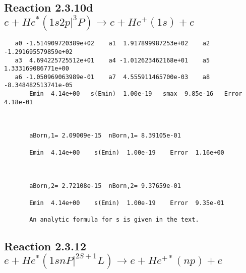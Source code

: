\documentclass[12pt]{article}
\begin{document}
\newpage
\subsection{
Reaction 2.3.10d $e + He^*(1s2p|^3P) \rightarrow e + He^+(1s) + e$}














\begin{small}\begin{verbatim}
   a0 -1.514909720389e+02    a1  1.917899987253e+02    a2 -1.291695579859e+02
   a3  4.694225725512e+01    a4 -1.012623462168e+01    a5  1.333169086771e+00
   a6 -1.050969063989e-01    a7  4.555911465700e-03    a8 -8.348482513741e-05
       Emin  4.14e+00   s(Emin)  1.00e-19   smax  9.85e-16   Error  4.18e-01



       aBorn,1= 2.09009e-15  nBorn,1= 8.39105e-01

       Emin  4.14e+00    s(Emin)  1.00e-19    Error  1.16e+00



       aBorn,2= 2.72108e-15  nBorn,2= 9.37659e-01

       Emin  4.14e+00    s(Emin)  1.00e-19    Error  9.35e-01

       An analytic formula for s is given in the text.
\end{verbatim}\end{small}






                           


\newpage
\subsection{
Reaction 2.3.12 $e + He^*(1snP|^{2S+1}L) \rightarrow e + He^{+*}(np)+e$}






\end{document}
